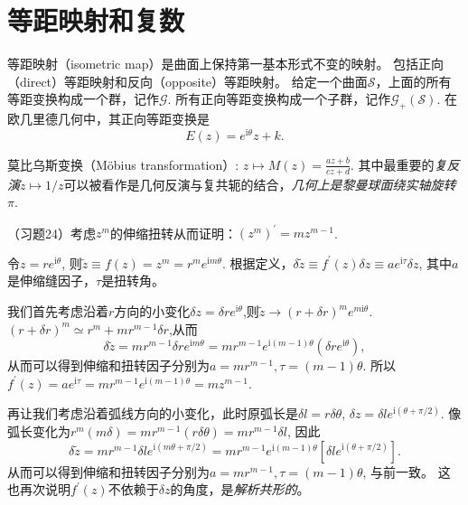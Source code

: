 \documentclass{article}
\begin{document}
\section{等距映射和复数}

等距映射（isometric map）是曲面上保持第一基本形式不变的映射。
包括正向（direct）等距映射和反向（opposite）等距映射。
给定一个曲面$\mathcal{S}$，上面的所有等距变换构成一个群，记作$\mathcal{G}$.
所有正向等距变换构成一个子群，记作$\mathcal{G}_{+}(\mathcal{S})$.
在欧几里德几何中，其正向等距变换是
\begin{equation*}
    E(z)=e^{\text{i}\theta}z+k.
\end{equation*}

莫比乌斯变换（Möbius transformation）: $z\mapsto M(z)=\frac{az+b}{cz+d}$.
其中最重要的\emph{复反演}$z\mapsto 1/z$可以被看作是几何反演与复共轭的结合，\emph{几何上是黎曼球面绕实轴旋转$\pi$}.

（习题24）考虑$z^{m}$的伸缩扭转从而证明：$(z^{m})^{\prime}=mz^{m-1}$.

令$z=re^{\mathrm{i}\theta}$, 则$\tilde{z}\equiv f(z)=z^{m}=r^{m}e^{\mathrm{i}m\theta}$.
根据定义，$\delta\tilde{z}\equiv f^{\prime}(z)\delta{z}\equiv ae^{\mathrm{i}\tau}\delta{z}$, 其中$a$是伸缩缝因子，$\tau$是扭转角。

我们首先考虑沿着$r$方向的小变化$\delta{z}=\delta{r}e^{\mathrm{i}\theta}$,则$\tilde{z}\rightarrow(r+\delta{r})^{m}e^{m\mathrm{i}\theta}$.
$(r+\delta{r})^{m}\simeq r^{m}+mr^{m-1}\delta{r}$,从而
\begin{equation*}
\delta\tilde{z}=mr^{m-1}\delta{r}e^{\mathrm{i}m\theta}=mr^{m-1}e^{\mathrm{i}(m-1)\theta}\left(\delta{r}e^{\mathrm{i}\theta}\right),
\end{equation*}
从而可以得到伸缩和扭转因子分别为$a=mr^{m-1},\tau=(m-1)\theta$.
所以$f^{\prime}(z)=ae^{\mathrm{i}\tau}=mr^{m-1}e^{\mathrm{i}(m-1)\theta}=mz^{m-1}$.

再让我们考虑沿着弧线方向的小变化，此时原弧长是$\delta{l}=r\delta\theta$,
$\delta{z}=\delta{l}e^{\mathrm{i}(\theta+\pi/2)}$.
像弧长变化为$r^{m}(m\delta)=mr^{m-1}(r\delta\theta)=mr^{m-1}\delta{l}$, 因此
\begin{equation*}
\delta\tilde{z}=mr^{m-1}\delta{l}e^{\mathrm{i}(m\theta+\pi/2)}=mr^{m-1}e^{\mathrm{i}(m-1)\theta}\left[\delta{l}e^{\mathrm{i}(\theta+\pi/2)}\right].
\end{equation*}
从而可以得到伸缩和扭转因子分别为$a=mr^{m-1},\tau=(m-1)\theta$, 与前一致。
这也再次说明$f^{\prime}(z)$不依赖于$\delta{z}$的角度，是\emph{解析共形的}。

%
%
\end{document}
